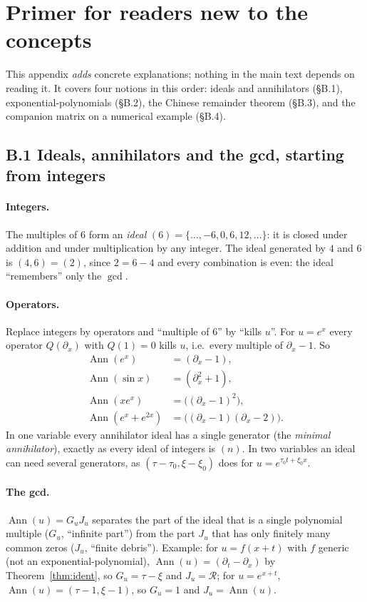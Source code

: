 \documentclass[11pt,a4paper]{article}
\theoremstyle{definition}
\newcommand{\Ann}{\operatorname{Ann}}
\newcommand{\ring}{\mathcal{R}}
\begin{document}
\section{Primer for readers new to the concepts}\label{app:primer}
This appendix \emph{adds} concrete explanations; nothing in the main text depends on reading it. It covers four notions in this order: ideals and annihilators (\S B.1), exponential-polynomials (\S B.2), the Chinese remainder theorem (\S B.3), and the companion matrix on a numerical example (\S B.4).

\subsection*{B.1 Ideals, annihilators and the gcd, starting from integers}
\paragraph{Integers.} The multiples of $6$ form an \emph{ideal} $(6)=\{\dots,-6,0,6,12,\dots\}$: it is closed under addition and under multiplication by any integer. The ideal generated by $4$ and $6$ is $(4,6)=(2)$, since $2=6-4$ and every combination is even: the ideal ``remembers'' only the $\gcd$.

\paragraph{Operators.} Replace integers by operators and ``multiple of $6$'' by ``kills $u$''. For $u=e^{x}$ every operator $Q(\partial_x)$ with $Q(1)=0$ kills $u$, i.e.\ every multiple of $\partial_x-1$. So
\[
\begin{aligned}
\Ann(e^x)&=(\partial_x-1),\\
\Ann(\sin x)&=(\partial_x^2+1),\\
\Ann(xe^x)&=\big((\partial_x-1)^2\big),\\
\Ann(e^x+e^{2x})&=\big((\partial_x-1)(\partial_x-2)\big).
\end{aligned}
\]
In one variable every annihilator ideal has a single generator (the \emph{minimal annihilator}), exactly as every ideal of integers is $(n)$. In two variables an ideal can need several generators, as $(\tau-\tau_0,\xi-\xi_0)$ does for $u=e^{\tau_0t+\xi_0x}$.

\paragraph{The gcd.} $\Ann(u)=G_uJ_u$ separates the part of the ideal that is a single polynomial multiple ($G_u$, ``infinite part'') from the part $J_u$ that has only finitely many common zeros ($J_u$, ``finite debris''). Example: for $u=f(x+t)$ with $f$ generic (not an exponential-polynomial), $\Ann(u)=(\partial_t-\partial_x)$ by Theorem~\ref{thm:ident}, so $G_u=\tau-\xi$ and $J_u=\ring$; for $u=e^{x+t}$, $\Ann(u)=(\tau-1,\xi-1)$, so $G_u=1$ and $J_u=\Ann(u)$.
\end{document}
